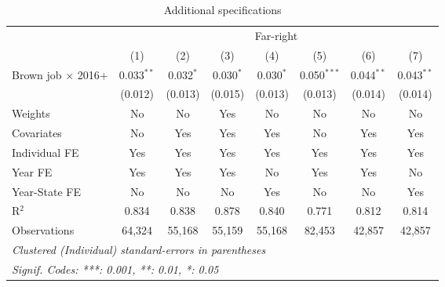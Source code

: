 \begin{table}[htbp]
   \caption{Additional specifications}
   \centering
   \begin{tabular}{lccccccc}
      \tabularnewline \midrule \midrule
       & \multicolumn{7}{c}{Far-right}\\
                                & (1)          & (2)         & (3)         & (4)         & (5)           & (6)          & (7)\\  
      Brown job $\times$ 2016+  & 0.033$^{**}$ & 0.032$^{*}$ & 0.030$^{*}$ & 0.030$^{*}$ & 0.050$^{***}$ & 0.044$^{**}$ & 0.043$^{**}$\\   
                                & (0.012)      & (0.013)     & (0.015)     & (0.013)     & (0.013)       & (0.014)      & (0.014)\\   
      Weights                   & No           & No          & Yes         & No          & No            & No           & No\\  
      Covariates                & No           & Yes         & Yes         & Yes         & No            & Yes          & Yes\\  
      Individual FE             & Yes          & Yes         & Yes         & Yes         & Yes           & Yes          & Yes\\  
      Year FE                   & Yes          & Yes         & Yes         & No          & Yes           & Yes          & No\\  
      Year-State FE             & No           & No          & No          & Yes         & No            & No           & Yes\\  
      R$^2$                     & 0.834        & 0.838       & 0.878       & 0.840       & 0.771         & 0.812        & 0.814\\  
      Observations              & 64,324       & 55,168      & 55,159      & 55,168      & 82,453        & 42,857       & 42,857\\  
      \midrule \midrule
      \multicolumn{8}{l}{\emph{Clustered (Individual) standard-errors in parentheses}}\\
      \multicolumn{8}{l}{\emph{Signif. Codes: ***: 0.001, **: 0.01, *: 0.05}}\\
   \end{tabular}
\end{table}



